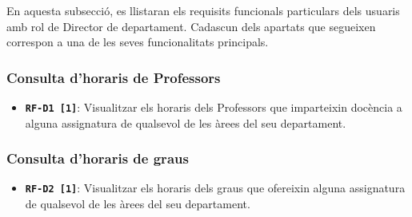 \documentclass[a4paper,12pt]{ThesisStyle}
\begin{document}
En aquesta subsecció, es llistaran els requisits funcionals particulars dels usuaris amb rol de Director de departament. Cadascun dels apartats que segueixen correspon a una de les seves funcionalitats principals.

\subsubsection{Consulta d'horaris de Professors}
\begin{itemize}
  \item \texttt{\textbf{RF-D1 [1]}}: Visualitzar els horaris dels Professors que imparteixin docència a alguna assignatura de qualsevol de les àrees del seu departament.
\end{itemize}

\subsubsection{Consulta d'horaris de graus}
\begin{itemize}
  \item \texttt{\textbf{RF-D2 [1]}}: Visualitzar els horaris dels graus que ofereixin alguna assignatura de qualsevol de les àrees del seu departament.
\end{itemize}
\end{document}

